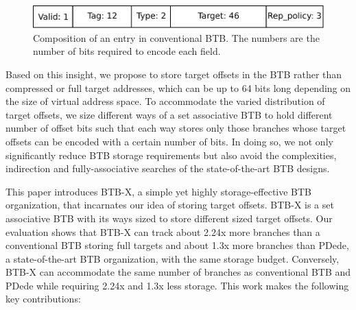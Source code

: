 \begin{figure}
\centering
\includegraphics[width=\columnwidth]{figures/i_btb.pdf}
\caption {Composition of an entry in conventional BTB. The numbers are the number of bits required to encode each field.}
\label{hpca:fig:conv-btb}
\end{figure}

Based on this insight, we propose to store target offsets in the BTB rather than compressed or full target addresses, which can be up to 64 bits long depending on the size of virtual address space. To accommodate the varied distribution of target offsets, we size different ways of a set associative BTB to hold different number of offset bits such that each way stores only those branches whose target offsets can be encoded with a certain number of bits. In doing so, we not only significantly reduce BTB storage requirements but also avoid the complexities, indirection and fully-associative searches of the state-of-the-art BTB designs.

This paper introduces BTB-X, a simple yet highly storage-effective BTB organization, that incarnates our idea of storing target offsets. BTB-X is a set associative BTB with its ways sized to store different sized target offsets. Our evaluation shows that BTB-X can track about 2.24x more branches than a conventional BTB storing full targets and about 1.3x more branches than PDede, a state-of-the-art BTB organization, with the same storage budget. Conversely, BTB-X can accommodate the same number of branches as conventional BTB and PDede while requiring 2.24x and 1.3x less storage. This work makes the following key contributions:

